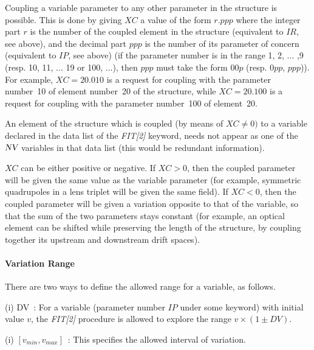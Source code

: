 \noindent  Coupling a variable parameter to any other parameter in the
structure is possible. This is done by giving $XC$ a value of the form $ r.ppp $ where
the integer part $ r $ is the number of the coupled element in the structure 
(equivalent to $ IR$, see above), and the decimal part $ ppp $ is the number of its 
parameter of concern (equivalent to $ IP$,  see above) (if the parameter
number is in the range 1, 2, ... ,9 (resp. 10, 11, ... 19 or 100, ...), then $ ppp $ 
must take the form $ 00p$ (resp. $0pp$, $ppp$)). For example, $ XC=20.010 $ is a request for coupling with the
parameter number~10 of element number~20 of the structure, while $ XC=20.100 $
is a request for coupling with the parameter number~100 of element~20.  

\bigskip

\noindent An element of the structure which is coupled (by means of $ XC\not= 0) $ to a 
variable declared in the data list of the \textsl{FIT[2]} keyword, needs not appear 
as one of the $ \textsl{NV} $ variables in that data list (this would be redundant information).  

\smallskip

\noindent $ XC $ can be either positive or negative. If $ XC>0$,  then the
coupled parameter will be given the same value as the variable parameter  
(for example, symmetric 
quadrupoles in a lens triplet will be given the same field). If $ XC<0$, 
then the coupled parameter will be given a variation opposite to that of the
variable, so that the sum of the two parameters stays constant (for example, an optical 
element can be shifted while preserving the length of the structure, by coupling 
together its upstream and downstream drift spaces).  

 
\paragraph{Variation Range  } 

\noindent There are two ways to define the allowed range for a variable, as follows. 

\medskip

\noindent (i) DV~: For a variable (parameter number $ IP $ under some keyword) 
 with initial value $ v $, the \textsl{FIT[2]} procedure is
allowed to explore the range $ v\times(1\pm DV)$.   

\smallskip

\noindent (i) $[v_{min}, v_{max}]$~: This specifies the allowed interval of variation. 


